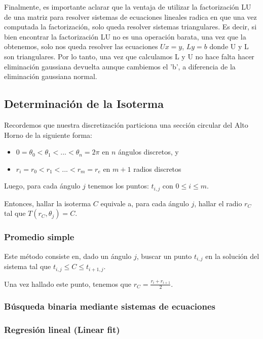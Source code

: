 Finalmente, es importante aclarar que la ventaja de utilizar la factorización LU de una matriz para resolver sistemas de ecuaciones lineales radica en que una vez computada la factorización, solo queda resolver sistemas triangulares. Es decir, si bien encontrar la factorización LU no es una operación barata, una vez que la obtenemos, solo nos queda resolver las ecuaciones $Ux = y$, $Ly = b$ donde U y L son triangulares. Por lo tanto, una vez que calculamos L y U no hace falta hacer eliminación gaussiana devuelta aunque cambiemos el 'b', a diferencia de la eliminación gaussiana normal.

\subsection{Determinación de la Isoterma}

Recordemos que nuestra discretización particiona una sección circular del Alto Horno de la siguiente forma:
 \begin{itemize}
 	\item $0 = \theta_0 < \theta_1 < ... < \theta_n = 2\pi$ en $n$ \'angulos discretos, y
 	\item $r_i = r_0 < r_1 < ... < r_m = r_e$ en $m+1$ radios discretos
 \end{itemize}

Luego, para cada ángulo $j$ tenemos los puntos: $t_{i,j}$ con $0 \leq i \leq m$.

Entonces, hallar la isoterma $C$ equivale a, para cada ángulo $j$, hallar el radio $r_C$ tal que $T(r_C, \theta_j) = C$.

\subsubsection{Promedio simple}

Este método consiste en, dado un ángulo $j$, buscar un punto $t_{i,j}$ en la solución del sistema tal que $t_{i,j} \leq C \leq t_{i+1,j}$.

Una vez hallado este punto, tenemos que $r_C = \frac{r_i + r_{i+1}}{2}$.

\subsubsection{Búsqueda binaria mediante sistemas de ecuaciones}



\subsubsection{Regresión lineal (Linear fit)}

